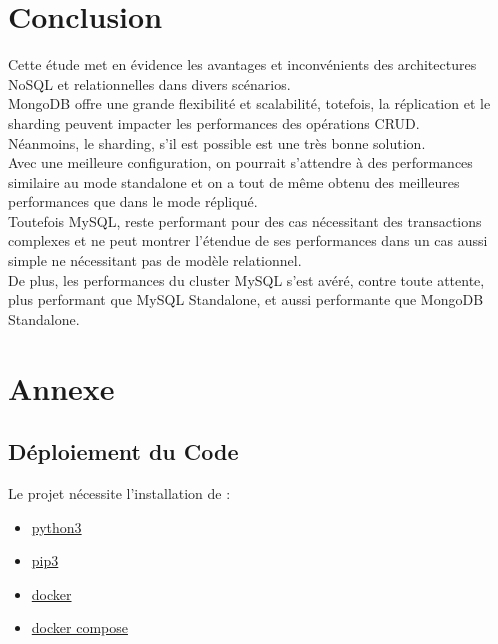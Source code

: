 \documentclass[12pt,a4paper]{report}
\begin{document}
\chapter{Conclusion}

    \begin{card}
        Cette étude met en évidence les avantages et inconvénients des architectures NoSQL et relationnelles dans divers scénarios. \\
        MongoDB offre une grande flexibilité et scalabilité, totefois, la réplication et le sharding peuvent impacter les performances des opérations CRUD. \\
        Néanmoins, le sharding, s'il est possible est une très bonne solution. \\
        Avec une meilleure configuration, on pourrait s'attendre à des performances similaire au mode standalone et on a tout de même obtenu des meilleures performances que dans le mode répliqué. \\
        Toutefois MySQL, reste performant pour des cas nécessitant des transactions complexes et ne peut montrer l'étendue de ses performances dans un cas aussi simple ne nécessitant pas de modèle relationnel. \\
        De plus, les performances du cluster MySQL s'est avéré, contre toute attente, plus performant que MySQL Standalone, et aussi performante que MongoDB Standalone. \\
    \end{card}

\appendix
\chapter{Annexe}
\section{Déploiement du Code}


Le projet nécessite l'installation de : 
\begin{itemize}
    \item \href{https://www.python.org/downloads/}{python3}
    \item \href{https://pip.pypa.io/en/stable/installation/}{pip3}
    \item \href{https://docs.docker.com/engine/install/}{docker}
    \item \href{https://docs.docker.com/compose/install/}{docker compose}
\end{itemize}
\end{document}
